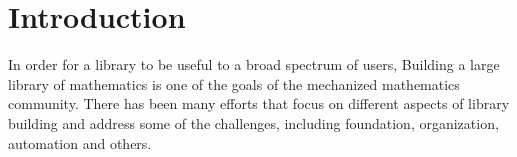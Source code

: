 \chapter{Introduction}



In order for a library to be useful to a broad spectrum of users, 
Building a large library of mathematics is one of the goals of the mechanized mathematics community. There has been many efforts that focus on different aspects of library building  
and address some of the challenges, including foundation, organization, automation and others. 

